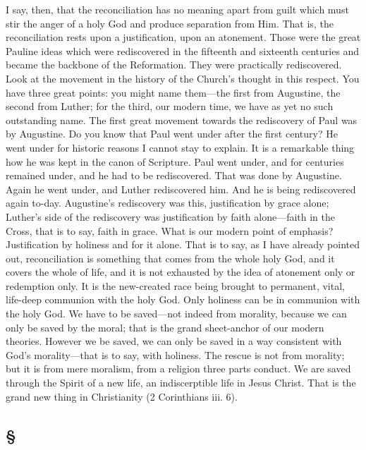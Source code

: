 \documentclass[draft]{ptfdoc}
\begin{document}
I say, then, that the reconciliation has no 
meaning apart from guilt which must stir the 
anger of a holy God and produce separation 
from Him. That is, the reconciliation rests 
upon a justification, upon an atonement. Those 
were the great Pauline ideas which were 
rediscovered in the fifteenth and sixteenth 
centuries and became the backbone of the Reformation.
They were practically rediscovered. 
Look at the movement in the history of the 
Church's thought in this respect. You have 
three great points: you might name them---the 
first from Augustine, the second from Luther; 
for the third, our modern time, we have as 
yet no such outstanding name. The first great 
movement towards the rediscovery of Paul 
was by Augustine. Do you know that Paul 
went under after the first century? He went 
under for historic reasons I cannot stay to 
explain. It is a remarkable thing how he was 
kept in the canon of Scripture. Paul went 
under, and for centuries remained under, and 
he had to be rediscovered. That was done by 
Augustine. Again he went under, and Luther 
rediscovered him. And he is being rediscovered 
again to-day. Augustine's rediscovery was this, 
justification by grace alone; Luther's side of the 
rediscovery was justification by faith alone---faith 
in the Cross, that is to say, faith in grace. 
What is our modern point of emphasis? Justification 
by holiness and for it alone. That is to 
say, as I have already pointed out, reconciliation 
is something that comes from the whole holy 
God, and it covers the whole of life, and it is not 
exhausted by the idea of atonement only or 
redemption only. It is the new-created race 
being brought to permanent, vital, life-deep 
communion with the holy God. Only holiness 
can be in communion with the holy God. We 
have to be saved---not indeed from morality, 
because we can only be saved by the moral; that 
is the grand sheet-anchor of our modern theories. 
However we be saved, we can only be saved 
in a way consistent with God's morality---that 
is to say, with holiness. The rescue is not from 
morality; but it is from mere moralism, from 
a religion three parts conduct. We are saved 
through the Spirit of a new life, an indiscerptible 
life in Jesus Christ. That is the grand 
new thing in Christianity (2 Corinthians iii. 6). 

\subsection*{
\S
}
\end{document}
